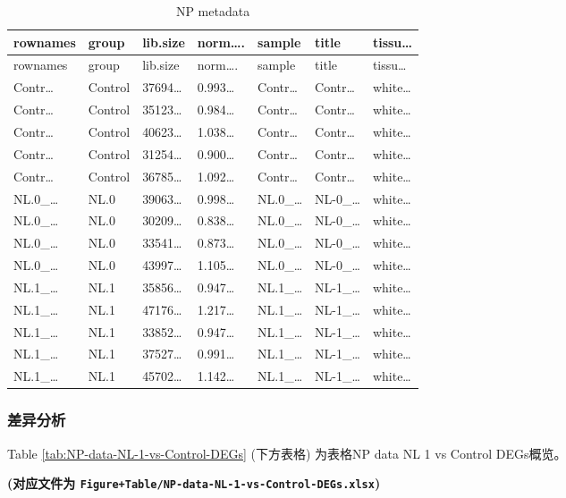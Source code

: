 \documentclass[
]{article}
\begin{document}
\begin{longtable}[]{@{}lllllll@{}}
\caption{\label{tab:NP-metadata}NP metadata}\tabularnewline
\toprule
rownames & group & lib.size & norm\ldots. & sample & title & tissu\ldots{}\tabularnewline
\midrule
\endfirsthead
\toprule
rownames & group & lib.size & norm\ldots. & sample & title & tissu\ldots{}\tabularnewline
\midrule
\endhead
Contr\ldots{} & Control & 37694\ldots{} & 0.993\ldots{} & Contr\ldots{} & Contr\ldots{} & white\ldots{}\tabularnewline
Contr\ldots{} & Control & 35123\ldots{} & 0.984\ldots{} & Contr\ldots{} & Contr\ldots{} & white\ldots{}\tabularnewline
Contr\ldots{} & Control & 40623\ldots{} & 1.038\ldots{} & Contr\ldots{} & Contr\ldots{} & white\ldots{}\tabularnewline
Contr\ldots{} & Control & 31254\ldots{} & 0.900\ldots{} & Contr\ldots{} & Contr\ldots{} & white\ldots{}\tabularnewline
Contr\ldots{} & Control & 36785\ldots{} & 1.092\ldots{} & Contr\ldots{} & Contr\ldots{} & white\ldots{}\tabularnewline
NL.0\_\ldots{} & NL.0 & 39063\ldots{} & 0.998\ldots{} & NL.0\_\ldots{} & NL-0\_\ldots{} & white\ldots{}\tabularnewline
NL.0\_\ldots{} & NL.0 & 30209\ldots{} & 0.838\ldots{} & NL.0\_\ldots{} & NL-0\_\ldots{} & white\ldots{}\tabularnewline
NL.0\_\ldots{} & NL.0 & 33541\ldots{} & 0.873\ldots{} & NL.0\_\ldots{} & NL-0\_\ldots{} & white\ldots{}\tabularnewline
NL.0\_\ldots{} & NL.0 & 43997\ldots{} & 1.105\ldots{} & NL.0\_\ldots{} & NL-0\_\ldots{} & white\ldots{}\tabularnewline
NL.1\_\ldots{} & NL.1 & 35856\ldots{} & 0.947\ldots{} & NL.1\_\ldots{} & NL-1\_\ldots{} & white\ldots{}\tabularnewline
NL.1\_\ldots{} & NL.1 & 47176\ldots{} & 1.217\ldots{} & NL.1\_\ldots{} & NL-1\_\ldots{} & white\ldots{}\tabularnewline
NL.1\_\ldots{} & NL.1 & 33852\ldots{} & 0.947\ldots{} & NL.1\_\ldots{} & NL-1\_\ldots{} & white\ldots{}\tabularnewline
NL.1\_\ldots{} & NL.1 & 37527\ldots{} & 0.991\ldots{} & NL.1\_\ldots{} & NL-1\_\ldots{} & white\ldots{}\tabularnewline
NL.1\_\ldots{} & NL.1 & 45702\ldots{} & 1.142\ldots{} & NL.1\_\ldots{} & NL-1\_\ldots{} & white\ldots{}\tabularnewline
\bottomrule
\end{longtable}

\hypertarget{ux5deeux5f02ux5206ux6790-1}{%
\subsubsection{差异分析}\label{ux5deeux5f02ux5206ux6790-1}}

Table \ref{tab:NP-data-NL-1-vs-Control-DEGs} (下方表格) 为表格NP data NL 1 vs Control DEGs概览。

\textbf{(对应文件为 \texttt{Figure+Table/NP-data-NL-1-vs-Control-DEGs.xlsx})}
\end{document}
